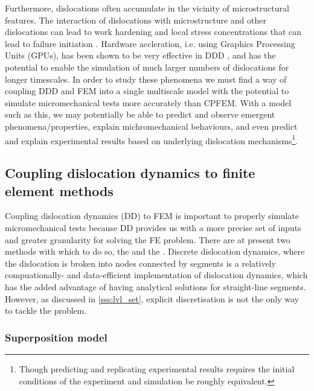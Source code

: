 Furthermore, dislocations often accumulate in the vicinity of microstructural features. The interaction of dislocations with microstructure and other dislocations can lead to work hardening and local stress concentrations that can lead to failure initiation \cite{size_effects, dln_ind_hard}. Hardware accleration, i.e. using Graphics Processing Units (GPUs), has been shown to be very effective in DDD \cite{gpu_ddd}, and has the potential to enable the simulation of much larger numbers of dislocations for longer timescales. In order to study these phenomena we must find a way of coupling DDD and FEM into a single multiscale model with the potential to simulate micromechanical tests more accurately than CPFEM. With a model such as this, we may potentially be able to predict and observe emergent phenomena/properties, explain michromechanical behaviours, and even predict and explain experimental results based on underlying dislocation mechanisms\footnote{Though predicting and replicating experimental results requires the initial conditions of the experiment and simulation be roughly equivalent.}.

\subsection{Coupling dislocation dynamics to finite element methods}
\label{ss:ddd_fem}

Coupling dislocation dynamics (DD) to FEM is important to properly simulate micromechanical tests because DD provides us with a more precise set of inputs and greater granularity for solving the FE problem. There are at present two methods with which to do so, the  and the . Discrete dislocation dynamics, where the dislocation is broken into nodes connected by segments is a relatively compuationally- and data-efficient implementation of dislocation dynamics, which has the added advantage of having analytical solutions for straight-line segments. However, as discussed in \cref{sss:lvl_set}, explicit discretisation is not the only way to tackle the problem.

\subsubsection{Superposition model}
\label{sss:superposition}

